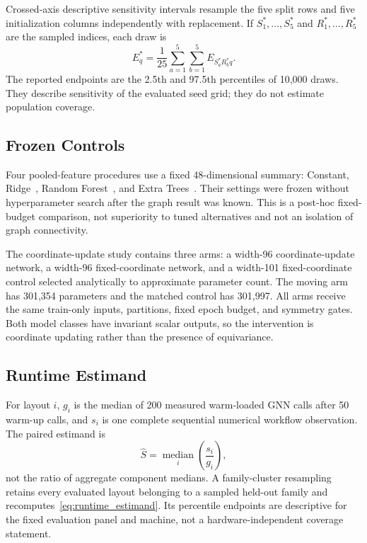 \documentclass[journal]{IEEEtran}
\begin{document}
Crossed-axis descriptive sensitivity intervals resample the five split rows and five initialization columns independently with replacement. If $S_1^{*},\ldots,S_5^{*}$ and $R_1^{*},\ldots,R_5^{*}$ are the sampled indices, each draw is
\begin{equation}
E_q^{*}=\frac{1}{25}\sum_{a=1}^{5}\sum_{b=1}^{5}
E_{S_a^{*}R_b^{*}q}.
\label{eq:crossed_resample}
\end{equation}
The reported endpoints are the 2.5th and 97.5th percentiles of 10,000 draws. They describe sensitivity of the evaluated seed grid; they do not estimate population coverage.

\subsection{Frozen Controls}
Four pooled-feature procedures use a fixed 48-dimensional summary: Constant, Ridge~\cite{ridge}, Random Forest~\cite{randomforest}, and Extra Trees~\cite{extratrees}. Their settings were frozen without hyperparameter search after the graph result was known. This is a post-hoc fixed-budget comparison, not superiority to tuned alternatives and not an isolation of graph connectivity.

The coordinate-update study contains three arms: a width-96 coordinate-update network, a width-96 fixed-coordinate network, and a width-101 fixed-coordinate control selected analytically to approximate parameter count. The moving arm has 301,354 parameters and the matched control has 301,997. All arms receive the same train-only inputs, partitions, fixed epoch budget, and symmetry gates. Both model classes have invariant scalar outputs, so the intervention is coordinate updating rather than the presence of equivariance.

\subsection{Runtime Estimand}
For layout $i$, $g_i$ is the median of 200 measured warm-loaded GNN calls after 50 warm-up calls, and $s_i$ is one complete sequential numerical workflow observation. The paired estimand is
\begin{equation}
\widehat{S}=\operatorname*{median}_{i}\left(\frac{s_i}{g_i}\right),
\label{eq:runtime_estimand}
\end{equation}
not the ratio of aggregate component medians. A family-cluster resampling retains every evaluated layout belonging to a sampled held-out family and recomputes~\eqref{eq:runtime_estimand}. Its percentile endpoints are descriptive for the fixed evaluation panel and machine, not a hardware-independent coverage statement.
\end{document}
